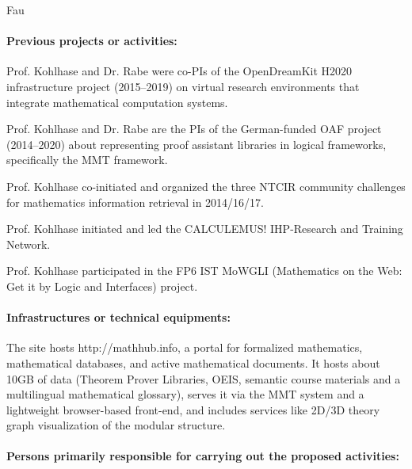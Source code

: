 \begin{sitedescription}{Fau}
\paragraph*{Previous projects or activities:}


\begin{compactitem}
 \item Prof. Kohlhase and Dr. Rabe were co-PIs of the OpenDreamKit H2020 infrastructure project (2015--2019) on virtual research environments that integrate mathematical computation systems.
 \item Prof. Kohlhase and Dr. Rabe are the PIs of the German-funded OAF project (2014--2020) about representing proof assistant libraries in logical frameworks, specifically the MMT framework.
 \item Prof. Kohlhase co-initiated and organized the three NTCIR community challenges for mathematics information retrieval in 2014/16/17.
 \item Prof. Kohlhase initiated and led the CALCULEMUS! IHP-Research and Training Network.
 \item Prof. Kohlhase participated in the FP6 IST MoWGLI (Mathematics on the Web: Get it by Logic and Interfaces) project.
\end{compactitem}

\paragraph*{Infrastructures or technical equipments:}

\begin{compactitem}
\item The site hosts http://mathhub.info, a portal for formalized mathematics, mathematical databases, and active mathematical documents.
It hosts about 10GB of data (Theorem Prover Libraries, OEIS, semantic course materials and a multilingual mathematical glossary), serves it via the MMT system and a lightweight browser-based front-end, and includes services like 2D/3D theory graph visualization of the modular structure.
\end{compactitem}

\paragraph*{Persons primarily responsible for carrying out the proposed activities:}


\end{sitedescription}
